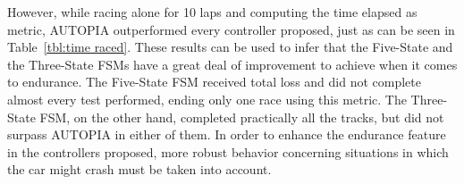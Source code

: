 	However, while racing alone for 10 laps and computing the time elapsed as metric, AUTOPIA outperformed every controller proposed, just as can be seen in Table~\ref{tbl:time raced}. These results can be used to infer that the Five-State and the Three-State FSMs have a great deal of improvement to achieve when it comes to endurance. The Five-State FSM received total loss and did not complete almost every test performed, ending only one race using this metric. The Three-State FSM, on the other hand, completed practically all the tracks, but did not surpass AUTOPIA in either of them. In order to enhance the endurance feature in the controllers proposed, more robust behavior concerning situations in which the car might crash must be taken into account.	
	